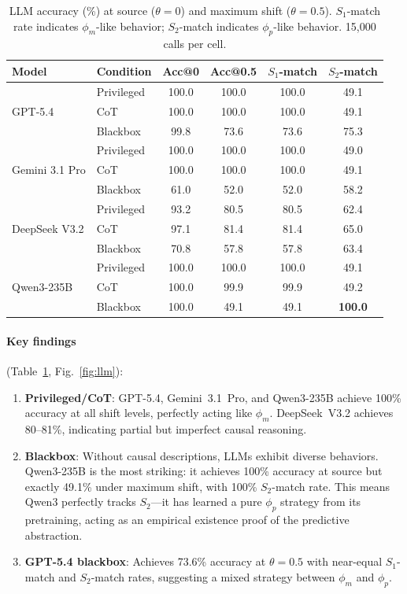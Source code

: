 \documentclass[runningheads]{llncs}
\newcommand{\phim}{\phi_m}
\newcommand{\phip}{\phi_p}
\begin{document}
\begin{table}[t]
\caption{LLM accuracy (\%) at source ($\theta = 0$) and maximum shift ($\theta = 0.5$). $S_1$-match rate indicates $\phim$-like behavior; $S_2$-match indicates $\phip$-like behavior. 15{,}000 calls per cell.}
\label{tab:llm}
\centering
\small
\begin{tabular}{llcccc}
\toprule
\textbf{Model} & \textbf{Condition} & \textbf{Acc@0} & \textbf{Acc@0.5} & \textbf{$S_1$-match} & \textbf{$S_2$-match} \\
\midrule
\multirow{3}{*}{GPT-5.4}
    & Privileged & 100.0 & 100.0 & 100.0 & 49.1 \\
    & CoT        & 100.0 & 100.0 & 100.0 & 49.1 \\
    & Blackbox   & 99.8  & 73.6  & 73.6  & 75.3 \\
\midrule
\multirow{3}{*}{Gemini 3.1 Pro}
    & Privileged & 100.0 & 100.0 & 100.0 & 49.0 \\
    & CoT        & 100.0 & 100.0 & 100.0 & 49.1 \\
    & Blackbox   & 61.0  & 52.0  & 52.0  & 58.2 \\
\midrule
\multirow{3}{*}{DeepSeek V3.2}
    & Privileged & 93.2  & 80.5  & 80.5  & 62.4 \\
    & CoT        & 97.1  & 81.4  & 81.4  & 65.0 \\
    & Blackbox   & 70.8  & 57.8  & 57.8  & 63.4 \\
\midrule
\multirow{3}{*}{Qwen3-235B}
    & Privileged & 100.0 & 100.0 & 100.0 & 49.1 \\
    & CoT        & 100.0 & 99.9  & 99.9  & 49.2 \\
    & Blackbox   & 100.0 & 49.1  & 49.1  & \textbf{100.0} \\
\bottomrule
\end{tabular}
\end{table}

\paragraph{Key findings} (Table~\ref{tab:llm}, Fig.~\ref{fig:llm}):
\begin{enumerate}
    \item \textbf{Privileged/CoT}: GPT-5.4, Gemini~3.1~Pro, and Qwen3-235B achieve 100\% accuracy at all shift levels, perfectly acting like $\phim$. DeepSeek~V3.2 achieves 80--81\%, indicating partial but imperfect causal reasoning.
    \item \textbf{Blackbox}: Without causal descriptions, LLMs exhibit diverse behaviors. Qwen3-235B is the most striking: it achieves 100\% accuracy at source but exactly 49.1\% under maximum shift, with 100\% $S_2$-match rate. This means Qwen3 perfectly tracks $S_2$---it has learned a pure $\phip$ strategy from its pretraining, acting as an empirical existence proof of the predictive abstraction.
    \item \textbf{GPT-5.4 blackbox}: Achieves 73.6\% accuracy at $\theta = 0.5$ with near-equal $S_1$-match and $S_2$-match rates, suggesting a mixed strategy between $\phim$ and $\phip$.
\end{enumerate}
\end{document}
